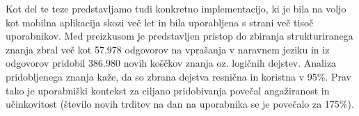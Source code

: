 Kot del te teze predstavljamo tudi konkretno implementacijo, ki je bila na voljo kot mobilna aplikacija skozi več let in bila uporabljena s strani več tisoč uporabnikov. Med preizkusom je predstavljen pristop do zbiranja strukturiranega znanja zbral več kot 57.978 odgovorov na vprašanja v naravnem jeziku in iz odgovorov pridobil 386.980 novih koščkov znanja oz. logičnih dejstev. Analiza pridobljenega znanja kaže, da so zbrana dejstva resnična in koristna v 95\%. Prav tako je uporabniški kontekst za ciljano pridobivanja povečal angažiranost in učinkovitost (število novih trditev na dan na uporabnika se je povečalo za 175\%).